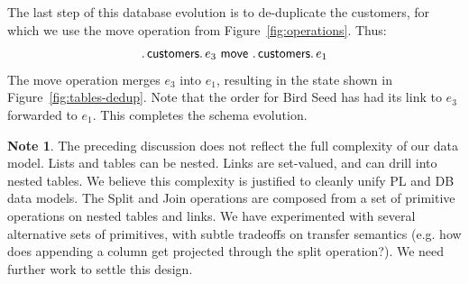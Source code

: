 \documentclass[english,submission]{programming}
\theoremstyle{definition}
\newtheorem*{remark}{Remark}
\newtheorem*{note}{Note}
\begin{document}
The last step of this database evolution is to de-duplicate the customers, for which we use the \textsf{move} operation from Figure~\ref{fig:operations}. Thus:
\[
\ldotp \textsf{customers}\ldotp e_3 \textsf{ move } \ldotp \textsf{customers}\ldotp e_1
\]
The \textsf{move} operation merges $e_3$ into $e_1$, resulting in the state shown in  Figure~\ref{fig:tables-dedup}. Note that the order for Bird Seed has had its link to $e_3$ forwarded to $e_1$. This completes the schema evolution.

\begin{note}
The preceding discussion does not reflect the full complexity of our data model. Lists and tables can be nested. Links are set-valued, and can drill into nested tables. We believe this complexity is justified to cleanly unify PL and DB data models. The \textsf{Split} and \textsf{Join} operations are composed from a set of primitive operations on nested tables and links. We have experimented with several alternative sets of primitives, with subtle tradeoffs on transfer semantics (e.g. how does appending a column get projected through the split operation?). We need further work to settle this design.
\end{note}


\end{document}
